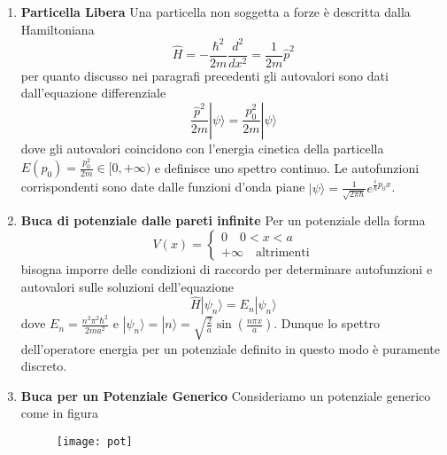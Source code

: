 \begin{enumerate}
	\item \textbf{Particella Libera}
	\newline
	\noindent Una particella non soggetta a forze \`e descritta dalla Hamiltoniana
	\begin{equation*}
		\hat{H} = - \frac{\hbar^2}{2m} \frac{d^2}{dx^2} = \frac{1}{2m} \hat{p}^2
	\end{equation*}
	per quanto discusso nei paragrafi precedenti gli autovalori sono dati dall'equazione differenziale
	\begin{equation*}
		\frac{\hat{p}^2}{2m}|\psi\rangle = \frac{p_0^2}{2m}|\psi \rangle 
	\end{equation*}
	dove gli autovalori coincidono con l'energia cinetica della particella $E(p_0) = \frac{p_0^2}{2m} \in [0,+\infty)$ e definisce uno spettro continuo. Le autofunzioni corrispondenti sono date dalle funzioni d'onda piane $|\psi \rangle = \frac{1}{\sqrt{2\pi \hbar}}e^{\frac{i}{\hbar}p_0x}$.
	\item \textbf{Buca di potenziale dalle pareti infinite}
	\newline
	\noindent Per un potenziale della forma 
	\begin{equation*}
		V(x) = \left \{ \begin{array}{l}
			0 \quad 0 < x < a \\
			+ \infty \quad \text{altrimenti}
		\end{array}\right.
	\end{equation*}
	bisogna imporre delle condizioni di raccordo per determinare autofunzioni e autovalori sulle soluzioni dell'equazione
	\begin{equation*}
		\hat{H} |\psi_n \rangle = E_n |\psi_n\rangle 
	\end{equation*}
	dove $E_n = \frac{n^2\pi^2\hbar^2}{2ma^2}$ e $|\psi_n \rangle  = |n\rangle  = \sqrt{\frac{2}{a}}\sin(\frac{n \pi x}{a})$. Dunque lo spettro dell'operatore energia per un potenziale definito in questo modo \`e puramente discreto.
	
	\item \textbf{Buca per un Potenziale Generico}
	\newline
	\noindent Consideriamo un potenziale generico come in figura 
	 
\begin{figure}[!ht]

\texttt{[image: pot]}	
\centering
\vspace{0.1in}
\caption{}
\end{figure} 
\end{enumerate}
